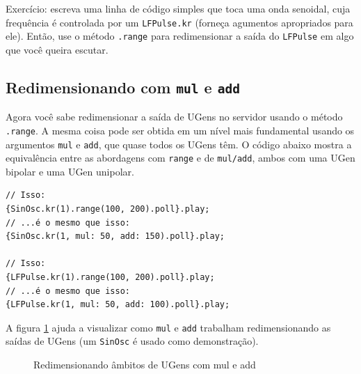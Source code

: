 Exercício: escreva uma linha de código simples que toca uma onda senoidal, cuja frequência é controlada por um \texttt{LFPulse.kr} (forneça agumentos apropriados para ele). Então, use o método \texttt{.range} para redimensionar a saída do \texttt{LFPulse} em algo que você queira escutar. 

\subsection{Redimensionando com \texttt{mul} e \texttt{add}}

Agora você sabe redimensionar a saída de UGens no servidor usando o método \texttt{.range}. A mesma coisa pode ser obtida em um nível mais fundamental usando os argumentos \texttt{mul} e \texttt{add}, que quase todos os UGens têm. O código abaixo mostra a equivalência entre as abordagens com \texttt{range} e de \texttt{mul/add}, ambos com uma UGen bipolar e uma UGen unipolar.

\begin{lstlisting}[style=SuperCollider-IDE, basicstyle=\scttfamily\footnotesize]
// Isso:
{SinOsc.kr(1).range(100, 200).poll}.play;
// ...é o mesmo que isso:
{SinOsc.kr(1, mul: 50, add: 150).poll}.play;

// Isso:
{LFPulse.kr(1).range(100, 200).poll}.play;
// ...é o mesmo que isso:
{LFPulse.kr(1, mul: 50, add: 100).poll}.play;
\end{lstlisting}

A figura \ref{fig:mul-add-scale} ajuda a visualizar como \texttt{mul} e \texttt{add} trabalham redimensionando as saídas de UGens (um \texttt{SinOsc} é usado como demonstração).

\begin{figure}[h!]
\centerline{}
\caption{Redimensionando âmbitos de UGens com mul e add}
\label{fig:mul-add-scale}
\end{figure}

